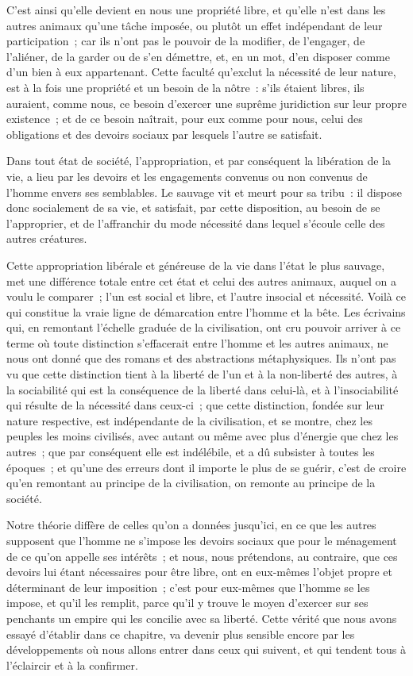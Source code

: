 \documentclass[french,twoside]{book} %
\newcommand\chapterclose{} %
\begin{document}
C’est ainsi qu’elle devient en nous une propriété libre, et qu’elle n’est dans les autres animaux qu’une tâche imposée, ou plutôt un effet indépendant de leur participation ; car ils n’ont pas le pouvoir de la modifier, de l’engager, de l’aliéner, de la garder ou de s’en démettre, et, en un mot, d’en disposer comme d’un bien à eux appartenant. Cette faculté qu’exclut la nécessité de leur nature, est à la fois une propriété et un besoin de la nôtre : s’ils étaient libres, ils auraient, comme nous, ce besoin d’exercer une suprême juridiction sur leur propre existence ; et de ce besoin naîtrait, pour eux comme pour nous, celui des obligations et des devoirs sociaux par lesquels l’autre se satisfait.\par
Dans tout état de société, l’appropriation, et par conséquent la libération de la vie, a lieu par les devoirs et les engagements convenus ou non convenus de l’homme envers ses semblables. Le sauvage vit et meurt pour sa tribu : il dispose donc socialement de sa vie, et satisfait, par cette disposition, au besoin de se l’approprier, et de l’affranchir du mode nécessité dans lequel s’écoule celle des autres créatures.\par
Cette appropriation libérale et généreuse de la vie dans l’état le plus sauvage, met une différence totale entre cet état et celui des autres animaux, auquel on a voulu le comparer ; l’un est social et libre, et l’autre insocial et nécessité. Voilà ce qui constitue la vraie ligne de démarcation entre l’homme et la bête. Les écrivains qui, en remontant l’échelle graduée de la civilisation, ont cru pouvoir arriver à ce terme où toute distinction s’effacerait entre l’homme et les autres animaux, ne nous ont donné que des romans et des abstractions métaphysiques. Ils n’ont pas vu que cette distinction tient à la liberté de l’un et à la non-liberté des autres, à la sociabilité qui est la conséquence de la liberté dans celui-là, et à l’insociabilité qui résulte de la nécessité dans ceux-ci ; que cette distinction, fondée sur leur nature respective, est indépendante de la civilisation, et se montre, chez les peuples les moins civilisés, avec autant ou même avec plus d’énergie que chez les autres ; que par conséquent elle est indélébile, et a dû subsister à toutes les époques ; et qu’une des erreurs dont il importe le plus de se guérir, c’est de croire qu’en remontant au principe de la civilisation, on remonte au principe de la société.\par
Notre théorie diffère de celles qu’on a données jusqu’ici, en ce que les autres supposent que l’homme ne s’impose les devoirs sociaux que pour le ménagement de ce qu’on appelle ses intérêts ; et nous, nous prétendons, au contraire, que ces devoirs lui étant nécessaires pour être libre, ont en eux-mêmes l’objet propre et déterminant de leur imposition ; c’est pour eux-mêmes que l’homme se les impose, et qu’il les remplit, parce qu’il y trouve le moyen d’exercer sur ses penchants un empire qui les concilie avec sa liberté. Cette vérité que nous avons essayé d’établir dans ce chapitre, va devenir plus sensible encore par les développements où nous allons entrer dans ceux qui suivent, et qui tendent tous à l’éclaircir et à la confirmer.
\chapterclose
\end{document}
